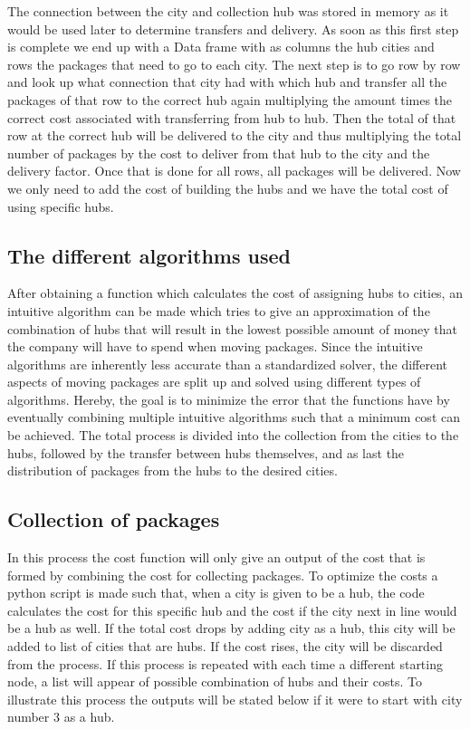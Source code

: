 \documentclass{article}
\begin{document}
        The connection between the city and collection hub was stored in memory as it would be used later to determine transfers and delivery. As soon as this first step is complete we end up with a Data frame with as columns the hub cities and rows the packages that need to go to each city. The next step is to go row by row and look up what connection that city had with which hub and transfer all the packages of that row to the correct hub again multiplying the amount times the correct cost associated with transferring from hub to hub. Then the total of that row at the correct hub will be delivered to the city and thus multiplying the total number of packages by the cost to deliver from that hub to the city and the delivery factor. Once that is done for all rows, all packages will be delivered. Now we only need to add the cost of building the hubs and we have the total cost of using specific hubs. %
        
        
    \subsection{The different algorithms used}
    
    After obtaining a function which calculates the cost of assigning hubs to cities, an intuitive algorithm can be made which tries to give an approximation of the combination of hubs that will result in the lowest possible amount of money that the company will have to spend when moving packages. 
    Since the intuitive algorithms are inherently less accurate than a standardized solver, the different aspects of moving packages are split up and solved using different types of algorithms. Hereby, the goal is to minimize the error that the functions have by eventually combining multiple intuitive algorithms such that a minimum cost can be achieved. The total process is divided into the collection from the cities to the hubs, followed by the transfer between hubs themselves, and as last the distribution of packages from the hubs to the desired cities. 
    \subsection{Collection of packages}  
    \label{Collection of packages}
    In this process the cost function will only give an output of the cost that is formed by combining the cost for collecting packages. To optimize the costs a python script is made such that, when a city is given to be a hub, the code calculates the cost for this specific hub and the cost if the city next in line would be a hub as well. If the total cost drops by adding city as a hub, this city will be added to list of cities that are hubs. If the cost rises, the city will be discarded from the process. If this process is repeated with each time a different starting node, a list will appear of possible combination of hubs and their costs. To illustrate this process the outputs will be stated below if it were to start with city number 3 as a hub.
\end{document}
